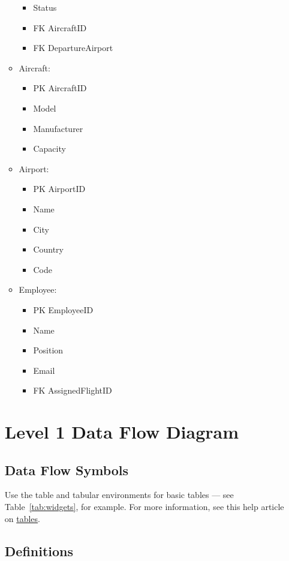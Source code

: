 \documentclass{article}
\begin{document}
\begin{itemize}
\begin{itemize}
\begin{itemize}
    \item       Status
    \item FK    AircraftID
    \item FK    DepartureAirport
    \end{itemize}
\item Aircraft:
    \begin{itemize}
    \item PK    AircraftID
    \item       Model
    \item       Manufacturer
    \item       Capacity
    \end{itemize}
\item Airport:
    \begin{itemize}
    \item PK    AirportID
    \item       Name
    \item       City
    \item       Country
    \item       Code
    \end{itemize}
\item Employee:
    \begin{itemize}
    \item PK    EmployeeID
    \item       Name
    \item       Position
    \item       Email
    \item FK    AssignedFlightID
    \end{itemize}
\end{itemize}

\section{Level 1 Data Flow Diagram}
\subsection{Data Flow Symbols}

Use the table and tabular environments for basic tables --- see Table~\ref{tab:widgets}, for example. For more information, see this help article on \href{https://www.overleaf.com/learn/latex/tables}{tables}. 

\subsection{Definitions}


\end{itemize}
\end{document}
